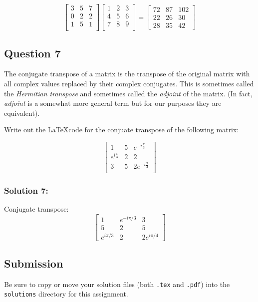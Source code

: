 \documentclass{article}
\begin{document}
\begin{equation*}
\begin{bmatrix}
    3 & 5 & 7  \\
    0 & 2 & 2  \\
    1 & 5 & 1  \\
\end{bmatrix}
\begin{bmatrix}
     1 & 2 & 3 \\
     4 & 5 & 6 \\
     7 & 8 & 9 \\
\end{bmatrix}
=
\begin{bmatrix}72&87&102\\22&26&30\\28&35&42\end{bmatrix}
\end{equation*}

\subsection*{Question 7}

The conjugate transpose of a matrix is the transpose of the original matrix with all complex values replaced by their complex conjugates. This is sometimes called the \textit{Hermitian transpose} and sometimes called the \textit{adjoint} of the matrix. (In fact, \textit{adjoint} is a somewhat more general term but for our purposes they are equivalent).

Write out the \LaTeX  code for the conjuate transpose of the following matrix:

\begin{equation*}
    \begin{bmatrix}
    1                   &  5         & e^{-i\frac{\pi}{3}}  \\
    e^{i\frac{\pi}{3}}  &  2         & 2  \\
    3                   &  5         & 2e^{-i\frac{\pi}{4}}  \\
\end{bmatrix}
\end{equation*}

\subsubsection*{Solution 7:}

Conjugate transpose:\[
\begin{bmatrix}
1 & e^{-i\pi/3} & 3\\
5 & 2 & 5\\
e^{i\pi/3} & 2 & 2e^{i\pi/4}
\end{bmatrix}
\]

\subsection*{Submission}

Be sure to copy or move your solution files (both \texttt{.tex} and \texttt{.pdf}) into the \texttt{solutions} directory for this assignment.
\end{document}
